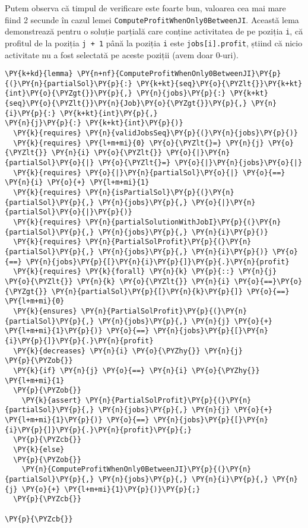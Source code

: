 Putem observa că timpul de verificare este foarte bun, valoarea cea mai mare  fiind 2 secunde în cazul lemei \texttt{ComputeProfitWhenOnly0BetweenJI}.
Această lema demonstrează pentru o soluție parțială care conține activitatea de pe poziția \texttt{i}, că profitul de la poziția \texttt{j + 1} până la poziția \texttt{i} este \texttt{jobs[i].profit}, știind că nicio activitate nu a fost selectată pe aceste poziții (avem doar 0-uri).

\begin{Verbatim}[commandchars=\\\{\}, fontsize=\footnotesize]
\PY{k+kd}{lemma} \PY{n+nf}{ComputeProfitWhenOnly0BetweenJI}\PY{p}{(}\PY{n}{partialSol}\PY{p}{:} \PY{k+kt}{seq}\PY{o}{\PYZlt{}}\PY{k+kt}{int}\PY{o}{\PYZgt{}}\PY{p}{,} \PY{n}{jobs}\PY{p}{:} \PY{k+kt}{seq}\PY{o}{\PYZlt{}}\PY{n}{Job}\PY{o}{\PYZgt{}}\PY{p}{,} \PY{n}{i}\PY{p}{:} \PY{k+kt}{int}\PY{p}{,}
\PY{n}{j}\PY{p}{:} \PY{k+kt}{int}\PY{p}{)}
  \PY{k}{requires} \PY{n}{validJobsSeq}\PY{p}{(}\PY{n}{jobs}\PY{p}{)}
  \PY{k}{requires} \PY{l+m+mi}{0} \PY{o}{\PYZlt{}=} \PY{n}{j} \PY{o}{\PYZlt{}} \PY{n}{i} \PY{o}{\PYZlt{}} \PY{o}{|}\PY{n}{partialSol}\PY{o}{|} \PY{o}{\PYZlt{}=} \PY{o}{|}\PY{n}{jobs}\PY{o}{|}
  \PY{k}{requires} \PY{o}{|}\PY{n}{partialSol}\PY{o}{|} \PY{o}{==} \PY{n}{i} \PY{o}{+} \PY{l+m+mi}{1}
  \PY{k}{requires} \PY{n}{isPartialSol}\PY{p}{(}\PY{n}{partialSol}\PY{p}{,} \PY{n}{jobs}\PY{p}{,} \PY{o}{|}\PY{n}{partialSol}\PY{o}{|}\PY{p}{)}
  \PY{k}{requires} \PY{n}{partialSolutionWithJobI}\PY{p}{(}\PY{n}{partialSol}\PY{p}{,} \PY{n}{jobs}\PY{p}{,} \PY{n}{i}\PY{p}{)}
  \PY{k}{requires} \PY{n}{PartialSolProfit}\PY{p}{(}\PY{n}{partialSol}\PY{p}{,} \PY{n}{jobs}\PY{p}{,} \PY{n}{i}\PY{p}{)} \PY{o}{==} \PY{n}{jobs}\PY{p}{[}\PY{n}{i}\PY{p}{]}\PY{p}{.}\PY{n}{profit}
  \PY{k}{requires} \PY{k}{forall} \PY{n}{k} \PY{p}{::} \PY{n}{j} \PY{o}{\PYZlt{}} \PY{n}{k} \PY{o}{\PYZlt{}} \PY{n}{i} \PY{o}{==}\PY{o}{\PYZgt{}} \PY{n}{partialSol}\PY{p}{[}\PY{n}{k}\PY{p}{]} \PY{o}{==} \PY{l+m+mi}{0}
  \PY{k}{ensures} \PY{n}{PartialSolProfit}\PY{p}{(}\PY{n}{partialSol}\PY{p}{,} \PY{n}{jobs}\PY{p}{,} \PY{n}{j} \PY{o}{+} \PY{l+m+mi}{1}\PY{p}{)} \PY{o}{==} \PY{n}{jobs}\PY{p}{[}\PY{n}{i}\PY{p}{]}\PY{p}{.}\PY{n}{profit}
  \PY{k}{decreases} \PY{n}{i} \PY{o}{\PYZhy{}} \PY{n}{j}
\PY{p}{\PYZob{}}
  \PY{k}{if} \PY{n}{j} \PY{o}{==} \PY{n}{i} \PY{o}{\PYZhy{}} \PY{l+m+mi}{1}
  \PY{p}{\PYZob{}}
    \PY{k}{assert} \PY{n}{PartialSolProfit}\PY{p}{(}\PY{n}{partialSol}\PY{p}{,} \PY{n}{jobs}\PY{p}{,} \PY{n}{j} \PY{o}{+} \PY{l+m+mi}{1}\PY{p}{)} \PY{o}{==} \PY{n}{jobs}\PY{p}{[}\PY{n}{i}\PY{p}{]}\PY{p}{.}\PY{n}{profit}\PY{p}{;}
  \PY{p}{\PYZcb{}}
  \PY{k}{else}
  \PY{p}{\PYZob{}}
    \PY{n}{ComputeProfitWhenOnly0BetweenJI}\PY{p}{(}\PY{n}{partialSol}\PY{p}{,} \PY{n}{jobs}\PY{p}{,} \PY{n}{i}\PY{p}{,} \PY{n}{j} \PY{o}{+} \PY{l+m+mi}{1}\PY{p}{)}\PY{p}{;}
  \PY{p}{\PYZcb{}}

\PY{p}{\PYZcb{}}
\end{Verbatim}


